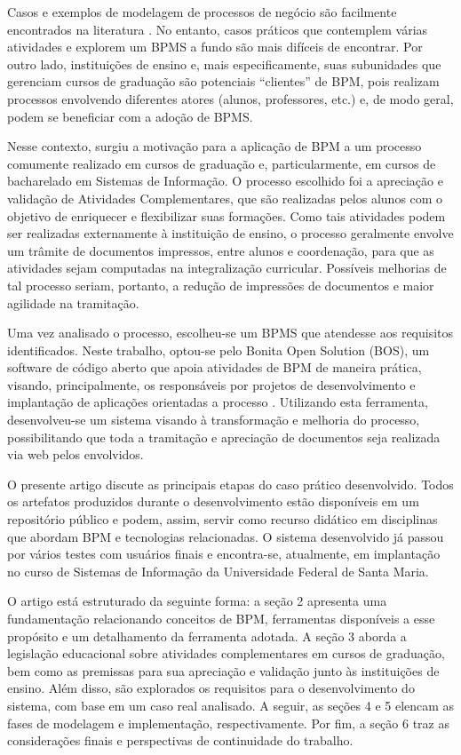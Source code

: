 \documentclass[12pt]{article}
\begin{document}
Casos e exemplos de modelagem de processos de negócio são facilmente encontrados na literatura \cite{laudon}. No entanto, casos práticos que contemplem várias atividades e explorem um BPMS a fundo são mais difíceis de encontrar. Por outro lado, instituições de ensino e, mais especificamente, suas subunidades que gerenciam cursos de graduação são potenciais “clientes” de BPM, pois realizam processos envolvendo diferentes atores (alunos, professores, etc.) e, de modo geral,  podem se beneficiar com a adoção de BPMS.

Nesse contexto, surgiu a motivação para a aplicação de BPM a um processo comumente realizado em cursos de graduação e, particularmente, em cursos de bacharelado em Sistemas de Informação. O processo escolhido foi a apreciação e validação de Atividades Complementares, que são realizadas pelos alunos com o objetivo de enriquecer e flexibilizar suas formações. Como tais atividades podem ser realizadas externamente à instituição de ensino, o processo geralmente envolve um trâmite de documentos impressos, entre alunos e coordenação, para que as atividades sejam computadas na integralização curricular. Possíveis melhorias de tal processo seriam, portanto, a redução de impressões de documentos e maior agilidade na tramitação.

Uma vez analisado o processo, escolheu-se um BPMS que atendesse aos requisitos identificados. Neste trabalho, optou-se pelo Bonita Open Solution (BOS), um software de código aberto que apoia atividades de BPM de maneira  prática, visando, principalmente, os  responsáveis  por projetos de desenvolvimento e implantação de aplicações orientadas a processo \cite{BONITASOFT}. Utilizando esta ferramenta, desenvolveu-se um sistema visando à transformação e melhoria do processo, possibilitando que toda a tramitação e apreciação de documentos seja realizada via web pelos envolvidos.

O presente artigo discute as principais etapas do caso prático desenvolvido. Todos os artefatos produzidos durante o desenvolvimento estão disponíveis em um repositório público e podem, assim, servir como recurso didático em disciplinas que abordam BPM e tecnologias relacionadas. O sistema desenvolvido já passou por vários testes com usuários finais e encontra-se, atualmente, em implantação no curso de Sistemas de Informação da Universidade Federal de Santa Maria.

O artigo está estruturado da seguinte forma: a seção 2 apresenta uma fundamentação relacionando conceitos de BPM, ferramentas disponíveis a esse propósito e um detalhamento da ferramenta adotada. A seção 3 aborda a legislação educacional sobre atividades complementares em cursos de graduação, bem como as premissas para sua apreciação e validação junto às instituições de ensino. Além disso, são explorados os requisitos para o desenvolvimento do sistema, com base em um caso real analisado. A seguir, as seções 4 e 5 elencam as fases de modelagem e implementação, respectivamente. Por fim, a seção 6 traz as considerações finais e perspectivas de continuidade do trabalho.
\end{document}
